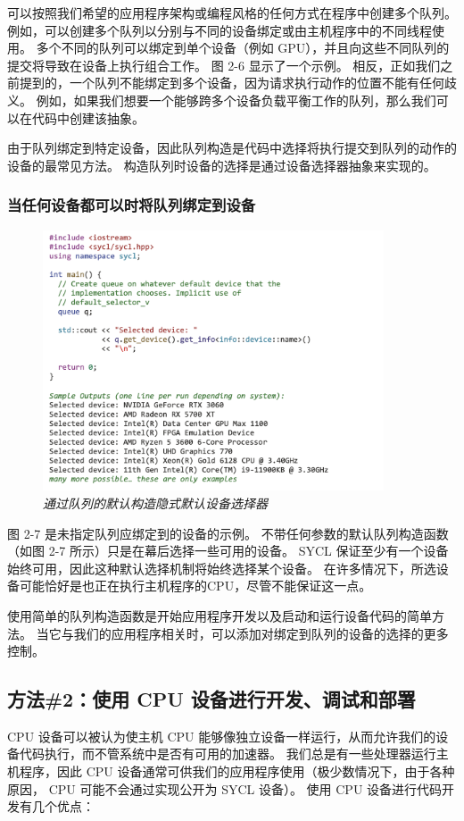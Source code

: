 可以按照我们希望的应用程序架构或编程风格的任何方式在程序中创建多个队列。 
例如，可以创建多个队列以分别与不同的设备绑定或由主机程序中的不同线程使用。 
多个不同的队列可以绑定到单个设备（例如 GPU），并且向这些不同队列的提交将导致在设备上执行组合工作。 
图 2-6 显示了一个示例。 相反，正如我们之前提到的，一个队列不能绑定到多个设备，因为请求执行动作的位置不能有任何歧义。 
例如，如果我们想要一个能够跨多个设备负载平衡工作的队列，那么我们可以在代码中创建该抽象。

由于队列绑定到特定设备，因此队列构造是代码中选择将执行提交到队列的动作的设备的最常见方法。 
构造队列时设备的选择是通过设备选择器抽象来实现的。

\subsubsection{当任何设备都可以时将队列绑定到设备}
\begin{figure}[H]
	\centering
	\includegraphics[width=0.9\textwidth]{figs/F2.7.png}
	\caption{\textit{通过队列的默认构造隐式默认设备选择器}}
\end{figure}

图 2-7 是未指定队列应绑定到的设备的示例。 不带任何参数的默认队列构造函数（如图 2-7 所示）只是在幕后选择一些可用的设备。 
SYCL 保证至少有一个设备始终可用，因此这种默认选择机制将始终选择某个设备。 
在许多情况下，所选设备可能恰好是也正在执行主机程序的CPU，尽管不能保证这一点。

使用简单的队列构造函数是开始应用程序开发以及启动和运行设备代码的简单方法。 
当它与我们的应用程序相关时，可以添加对绑定到队列的设备的选择的更多控制。

\subsection{方法\#2：使用 CPU 设备进行开发、调试和部署}
CPU 设备可以被认为使主机 CPU 能够像独立设备一样运行，从而允许我们的设备代码执行，而不管系统中是否有可用的加速器。 
我们总是有一些处理器运行主机程序，因此 CPU 设备通常可供我们的应用程序使用（极少数情况下，由于各种原因，
CPU 可能不会通过实现公开为 SYCL 设备）。 使用 CPU 设备进行代码开发有几个优点：

